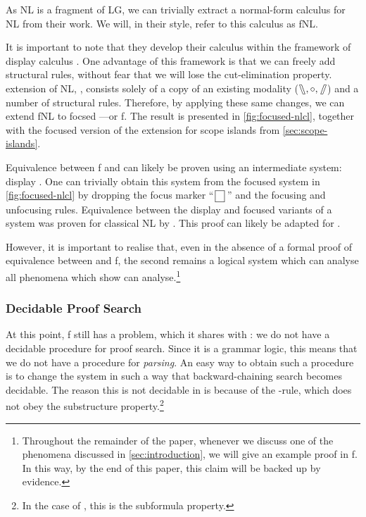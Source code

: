 \documentclass[10pt,a4paper]{llncs}
\begin{document}
As NL is a fragment of LG, we can trivially extract a normal-form
calculus for NL from their work.
We will, in their style, refer to this calculus as fNL.

It is important to note that they develop their calculus within the
framework of display calculus \citep{belnap1982}.
One advantage of this framework is that we can freely add structural
rules, without fear that we will lose the cut-elimination property.
 extension of NL, {\NLCL}, consists solely of a copy
of an existing modality ($\fatbslash,\mathbin{\circ},\mathbin{\!\fatslash\,}$) and a number of
structural rules.
Therefore, by applying these same changes, we can extend fNL to focsed
{\NLCL}---or {f\NLCL}.
The result is presented in \autoref{fig:focused-nlcl},
together with the focused version of the extension for scope islands
from \autoref{sec:scope-islands}.



Equivalence between {f\NLCL} and {\NLCL} can likely be proven using
an intermediate system: display {\NLCL}. One can trivially obtain this
system from the focused system in \autoref{fig:focused-nlcl} by
dropping the focus marker ``$\,\boxed{ \phantom{\cdot} }\,$'' and the
focusing and unfocusing rules.
Equivalence between the display and focused variants of a system was
proven for classical NL by \citet{bastenhof2011}.
This proof can likely be adapted for {\NLCL}.

However, it is important to realise that, even in the absence of a
formal proof of equivalence between {\NLCL} and {f\NLCL}, the second
remains a logical system which can analyse all phenomena which
\citet{barker2015} show {\NLCL} can analyse.\footnote{%
  Throughout the remainder of the paper, whenever we discuss one of
  the phenomena discussed in \autoref{sec:introduction}, we will give
  an example proof in {f\NLCL}. In this way, by the end of this paper,
  this claim will be backed up by evidence.
}

\subsubsection{Decidable Proof Search}%
\label{sec:decidable-proof-search}

At this point, {f\NLCL} still has a problem, which it shares with
{\NLCL}: we do not have a decidable procedure for proof search.
Since it is a grammar logic, this means that we do not have a
procedure for \emph{parsing}.
An easy way to obtain such a procedure is to change the system in such
a way that backward-chaining search becomes decidable. The reason this
is not decidable in {\NLCL} is because of the \I-rule, which does not
obey the substructure property.\footnote{%
  In the case of {\NLCL}, this is the subformula property.
}
\end{document}
